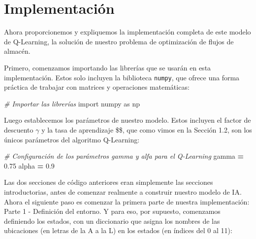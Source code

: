 \documentclass[
]{book}
\newenvironment{Shaded}{\begin{snugshade}}{\end{snugshade}}
\newcommand{\CommentTok}[1]{\textcolor[rgb]{0.56,0.35,0.01}{\textit{#1}}}
\newcommand{\FloatTok}[1]{\textcolor[rgb]{0.00,0.00,0.81}{#1}}
\newcommand{\ImportTok}[1]{#1}
\newcommand{\NormalTok}[1]{#1}
\newcommand{\OperatorTok}[1]{\textcolor[rgb]{0.81,0.36,0.00}{\textbf{#1}}}
\begin{document}
\hypertarget{implementaciuxf3n}{%
\section{Implementación}\label{implementaciuxf3n}}

Ahora proporcionemos y expliquemos la implementación completa de este modelo de Q-Learning, la solución de nuestro problema de optimización de flujos de almacén.

Primero, comenzamos importando las librerías que se usarán en esta implementación. Estos solo incluyen la biblioteca \texttt{numpy}, que ofrece una forma práctica de trabajar con matrices y operaciones matemáticas:

\begin{Shaded}
\begin{Highlighting}[]
\CommentTok{\# Importar las librerías}
\ImportTok{import}\NormalTok{ numpy }\ImportTok{as}\NormalTok{ np}
\end{Highlighting}
\end{Shaded}

Luego establecemos los parámetros de nuestro modelo. Estos incluyen el factor de descuento \(\gamma\) y la tasa de aprendizaje \$\alpha \$, que como vimos en la Sección 1.2, son los únicos parámetros del algoritmo Q-Learning:

\begin{Shaded}
\begin{Highlighting}[]
\CommentTok{\# Configuración de los parámetros gamma y alfa para el Q{-}Learning}
\NormalTok{gamma }\OperatorTok{=} \FloatTok{0.75}
\NormalTok{alpha }\OperatorTok{=} \FloatTok{0.9}
\end{Highlighting}
\end{Shaded}

Las dos secciones de código anteriores eran simplemente las secciones introductorias, antes de comenzar realmente a construir nuestro modelo de IA. Ahora el siguiente paso es comenzar la primera parte de nuestra implementación: Parte 1 - Definición del entorno. Y para eso, por supuesto, comenzamos definiendo los estados, con un diccionario que asigna los nombres de las ubicaciones (en letras de la A a la L) en los estados (en índices del 0 al 11):
\end{document}

